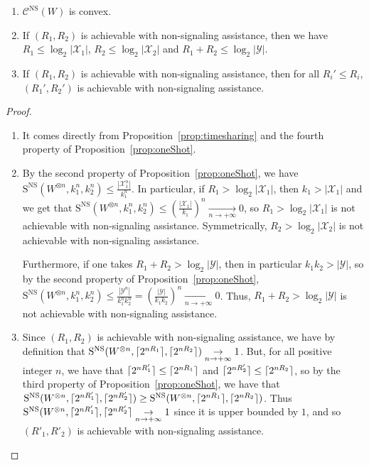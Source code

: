 \begin{corollary}
  \label{cor:asymptotic}
  \begin{enumerate}
      \item $\mathcal{C}^{\mathrm{NS}}(W)$ is convex.
      \item If $(R_1,R_2)$ is achievable with non-signaling assistance, then we have $R_1 \leq \log_2|\mathcal{X}_1|$, $R_2 \leq \log_2|\mathcal{X}_2|$ and $R_1 + R_2 \leq \log_2|\mathcal{Y}|$.
      \item If $(R_1,R_2)$ is achievable with non-signaling assistance, then for all $R_i' \leq R_i$, $(R_1',R_2')$ is achievable with non-signaling assistance.
  \end{enumerate}
\end{corollary}

\begin{proof}
  \begin{enumerate}
    \item It comes directly from Proposition~\ref{prop:timesharing} and the fourth property of Proposition~\ref{prop:oneShot}.
    
  \item By the second property of Proposition~\ref{prop:oneShot}, we have$\mathrm{S}^{\mathrm{NS}}(W^{\otimes n},k_1^n,k_2^n) \leq \frac{|\mathcal{X}_1^n|}{k_1^n}$. In particular, if $R_1 > \log_2 |\mathcal{X}_1|$, then $k_1 > |\mathcal{X}_1|$ and we get that $\mathrm{S}^{\mathrm{NS}}(W^{\otimes n},k_1^n,k_2^n) \leq \left(\frac{|\mathcal{X}_1|}{k_1}\right)^n \underset{n \rightarrow +\infty}{\rightarrow} 0$, so $R_1 > \log_2 |\mathcal{X}_1|$ is not achievable with non-signaling assistance. Symmetrically, $R_2 > \log_2 |\mathcal{X}_2|$ is not achievable with non-signaling assistance.

    Furthermore, if one takes $R_1+R_2 > \log_2|\mathcal{Y}|$, then in particular $k_1k_2 > |\mathcal{Y}|$, so by the second property of Proposition~\ref{prop:oneShot}, $\mathrm{S}^{\mathrm{NS}}(W^{\otimes n},k_1^n,k_2^n) \leq \frac{|\mathcal{Y}^n|}{k_1^nk_2^n} = \left(\frac{|\mathcal{Y}|}{k_1k_2}\right)^n \underset{n \rightarrow +\infty}{\rightarrow} 0$. Thus, $R_1+R_2 > \log_2|\mathcal{Y}|$ is not achievable with non-signaling assistance.
    
  \item Since $(R_1,R_2)$ is achievable with non-signaling assistance, we have by definition that $\mathrm{S}^{\mathrm{NS}}(W^{\otimes n},\lceil2^{nR_1}\rceil,\lceil2^{nR_2}\rceil) \underset{n \rightarrow +\infty}{\rightarrow} 1$. But, for all positive integer $n$, we have that $\lceil2^{nR'_1}\rceil \leq \lceil2^{nR_1}\rceil$ and $\lceil2^{nR'_2}\rceil\leq \lceil2^{nR_2}\rceil$, so by the third property of Proposition~\ref{prop:oneShot}, we have that $\mathrm{S}^{\mathrm{NS}}(W^{\otimes n},\lceil2^{nR'_1}\rceil,\lceil2^{nR'_2}\rceil) \geq \mathrm{S}^{\mathrm{NS}}(W^{\otimes n},\lceil2^{nR_1}\rceil,\lceil2^{nR_2}\rceil)$. Thus $\mathrm{S}^{\mathrm{NS}}(W^{\otimes n},\lceil2^{nR'_1}\rceil,\lceil2^{nR'_2}\rceil \underset{n \rightarrow +\infty}{\rightarrow} 1$ since it is upper bounded by $1$, and so $(R'_1,R'_2)$ is achievable with non-signaling assistance.
  \end{enumerate}
\end{proof}


